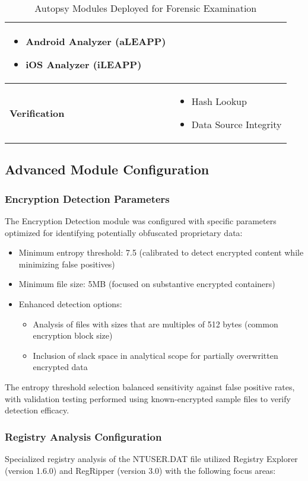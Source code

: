 \begin{table}[h]
\begin{tabular}{|p{5cm}|p{10cm}|}
\begin{itemize}
    \item Android Analyzer (aLEAPP)
    \item iOS Analyzer (iLEAPP)
\end{itemize} \\
\hline
\textbf{Verification} & 
\begin{itemize}
    \item Hash Lookup
    \item Data Source Integrity
\end{itemize} \\
\hline
\end{tabular}
\caption{Autopsy Modules Deployed for Forensic Examination}
\label{tab:autopsy_modules}
\end{table}

\subsection{Advanced Module Configuration}

\subsubsection{Encryption Detection Parameters}
The Encryption Detection module was configured with specific parameters optimized for identifying potentially obfuscated proprietary data:

\begin{itemize}
    \item Minimum entropy threshold: 7.5 (calibrated to detect encrypted content while minimizing false positives)
    \item Minimum file size: 5MB (focused on substantive encrypted containers)
    \item Enhanced detection options:
    \begin{itemize}
        \item Analysis of files with sizes that are multiples of 512 bytes (common encryption block size)
        \item Inclusion of slack space in analytical scope for partially overwritten encrypted data
    \end{itemize}
\end{itemize}

The entropy threshold selection balanced sensitivity against false positive rates, with validation testing performed using known-encrypted sample files to verify detection efficacy.

\subsubsection{Registry Analysis Configuration}
Specialized registry analysis of the NTUSER.DAT file utilized Registry Explorer (version 1.6.0) and RegRipper (version 3.0) with the following focus areas:


